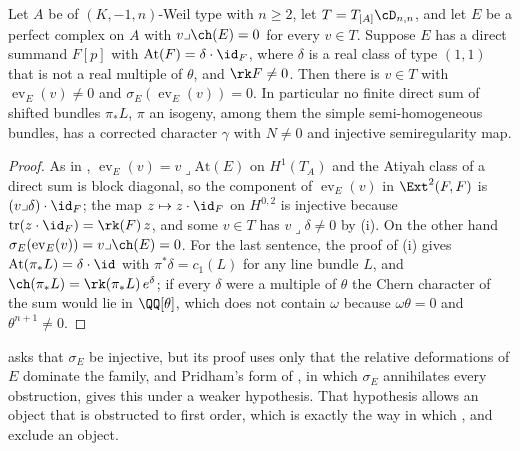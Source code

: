 \begin{proposition}\label{prop:scalaratiyah}
Let $A$ be of $(K,-1,n)$-Weil type with $n\ge2$, let $T=T_{[A]}\cD_{n,n}$, and
let $E$ be a perfect complex on $A$ with $v\lrcorner\ch(E)=0$ for every
$v\in T$. Suppose $E$ has a direct summand $F[p]$ with
$\mathrm{At}(F)=\delta\cdot\id_{F}$, where $\delta$ is a real class of type
$(1,1)$ that is not a real multiple of $\theta$, and $\rk F\ne0$. Then there is
$v\in T$ with $\operatorname{ev}_{E}(v)\ne0$ and
$\sigma_{E}(\operatorname{ev}_{E}(v))=0$. In particular no finite direct sum
of shifted bundles $\pi_{*}L$, $\pi$ an isogeny, among them the simple
semi-homogeneous bundles, has a corrected character $\gamma$ with $N\ne0$ and
injective semiregularity map.
\end{proposition}

\begin{proof}
As in , $\operatorname{ev}_{E}(v)=v\lrcorner\mathrm{At}(E)$
on $H^{1}(T_{A})$ and the Atiyah class of a direct sum is block diagonal, so
the component of $\operatorname{ev}_{E}(v)$ in $\Ext^{2}(F,F)$ is
$(v\lrcorner\delta)\cdot\id_{F}$; the map $z\mapsto z\cdot\id_{F}$ on
$H^{0,2}$ is injective because $\mathrm{tr}(z\cdot\id_{F})=\rk(F)\,z$, and
some $v\in T$ has $v\lrcorner\delta\ne0$ by (i). On the
other hand $\sigma_{E}(\operatorname{ev}_{E}(v))=v\lrcorner\ch(E)=0$. For the
last sentence, the proof of (i) gives
$\mathrm{At}(\pi_{*}L)=\delta\cdot\id$ with $\pi^{*}\delta=c_{1}(L)$ for any
line bundle $L$, and $\ch(\pi_{*}L)=\rk(\pi_{*}L)\,e^{\delta}$; if every
$\delta$ were a multiple of $\theta$ the Chern character of the sum would lie
in $\QQ[\theta]$, which does not contain $\omega$ because $\omega\theta=0$ and
$\theta^{n+1}\ne0$.
\end{proof}

 asks that $\sigma_{E}$ be injective, but its proof
uses only that the relative deformations of $E$ dominate the family, and
Pridham's form of , in which $\sigma_{E}$ annihilates every
obstruction, gives this under a weaker hypothesis. That hypothesis allows an
object that is obstructed to first order, which is exactly the way in which
,  and  exclude
an object.

